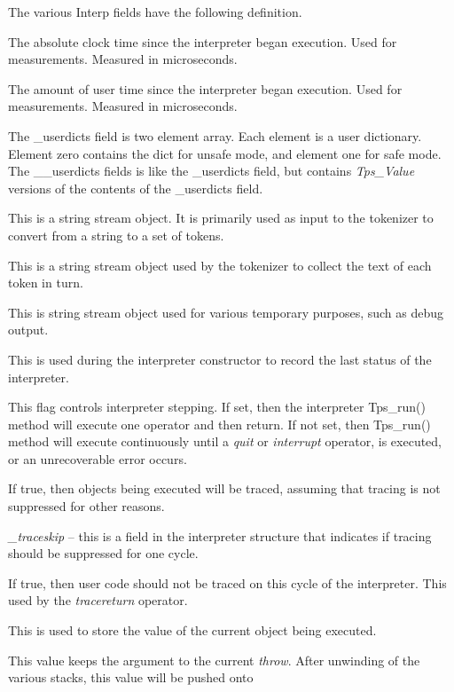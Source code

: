 The various Interp fields have the following definition.
\begin{description}
\item[\_realtime :]
The absolute clock time since the interpreter began execution.
Used for measurements.
Measured in microseconds.
\item[\_usertime :]
The amount of user time since the interpreter began execution.
Used for measurements.
Measured in microseconds.
\item[\_userdicts, \_\_userdicts :]
The \_userdicts field is two element array.
Each element is a user dictionary.
Element zero contains the dict for unsafe mode, and element one
for safe mode.
The \_\_userdicts fields is like the \_userdicts field, but
contains {\em Tps\_Value} versions of the contents of the \_userdicts field.
\item[\_inbuf :]
This is a string stream object.  It is primarily used as input to
the tokenizer to convert from a string to a set of tokens.
\item[\_tokenbuf :]
This is a string stream object used by the tokenizer to collect
the text of each token in turn.
\item[\_tempbuf :]
This is string stream object used for various temporary purposes,
such as debug output.
\item[\_status :]
This is used during the interpreter constructor to record
the last status of the interpreter.
\item[\_step :]
This flag controls interpreter stepping.
If set, then the interpreter Tps\_run() method will execute
one operator and then return.
If not set, then  Tps\_run() method will execute continuously
until a {\em quit} or {\em interrupt} operator, is executed, or
an unrecoverable error occurs.
\item[\_tracing :]
If true, then objects being executed will be traced,
assuming that tracing is not suppressed for other reasons.
\item {\em \_traceskip} -- this is a field in the interpreter
structure that indicates if tracing should be suppressed
for one cycle.
\item[\_traceskip :]
If true, then user code should not be traced on this cycle
of the interpreter.
This used by the {\em tracereturn} operator.
\item[\_object :]
This is used to store the value of the current object being executed.
\item[\_throwflag :]
This value keeps the argument to the current {\em throw}.
After unwinding of the various stacks, this value will be pushed onto

\end{description}
